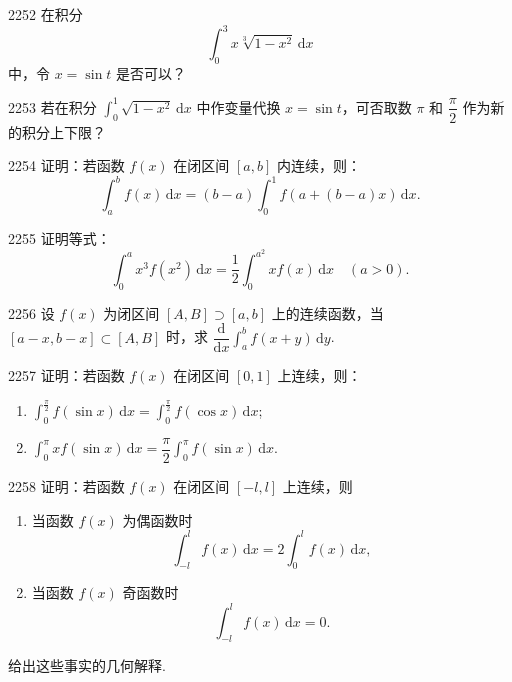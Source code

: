 \begin{prob}[M]{2252}
在积分
\[ \int_0^3 x \sqrt[3]{1-x^2}\,\mathrm{d}x \]
中，令 $x = \sin t$ 是否可以？
\end{prob}

\begin{prob}[M]{2253}
若在积分 $\int_0^1 \sqrt{1-x^2}\,\mathrm{d}x$ 中作变量代换 $x = \sin t$，可否取数 $\pi$ 和 $\dfrac{\pi}{2}$ 作为新的积分上下限？
\end{prob}

\begin{prob}[M]{2254}
证明：若函数 $f(x)$ 在闭区间 $[a, b]$ 内连续，则：
\[ \int_a^b f(x)\,\mathrm{d}x = (b-a) \int_0^1 f(a + (b-a)x)\,\mathrm{d}x. \]
\end{prob}

\begin{prob}[M]{2255}
证明等式：
\[ \int_0^a x^3 f(x^2)\,\mathrm{d}x = \frac{1}{2} \int_0^{a^2} x f(x)\,\mathrm{d}x \quad (a > 0). \]
\end{prob}

\begin{prob}[M]{2256}
设 $f(x)$ 为闭区间 $[A, B] \supset [a, b]$ 上的连续函数，当 $[a-x, b-x] \subset [A, B]$ 时，求 $\dfrac{\mathrm{d}}{\mathrm{d}x} \int_a^b f(x+y)\,\mathrm{d}y$.
\end{prob}

\begin{prob}[M]{2257}
证明：若函数 $f(x)$ 在闭区间 $[0, 1]$ 上连续，则：
\begin{enumerate}[label=(\alph*), itemsep=2pt, topsep=3pt]
  \item $\int_0^{\frac{\pi}{2}} f(\sin x)\,\mathrm{d}x = \int_0^{\frac{\pi}{2}} f(\cos x)\,\mathrm{d}x$;
  \item $\int_0^\pi x f(\sin x)\,\mathrm{d}x = \dfrac{\pi}{2} \int_0^\pi f(\sin x)\,\mathrm{d}x$.
\end{enumerate}
\end{prob}

\begin{prob}[M]{2258}
证明：若函数 $f(x)$ 在闭区间 $[-l, l]$ 上连续，则
\begin{enumerate}[label=(\arabic*), itemsep=2pt, topsep=3pt]
  \item 当函数 $f(x)$ 为偶函数时
  \[ \int_{-l}^l f(x)\,\mathrm{d}x = 2\int_0^l f(x)\,\mathrm{d}x, \]
  \item 当函数 $f(x)$ 奇函数时
  \[ \int_{-l}^l f(x)\,\mathrm{d}x = 0. \]
\end{enumerate}
给出这些事实的几何解释.
\end{prob}

